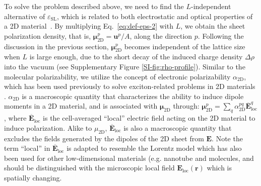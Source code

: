 \documentclass[journal=ancac3,manuscript=article,email=true,hyperref=true,keywords=false]{achemso}
\begin{document}
To solve the problem described above, we need to find the
$L$-independent alternative of $\varepsilon_{\mathrm{SL}}$, which is
related to both electrostatic and optical properties of a 2D
material~\cite{Matthes_2016}. By multiplying Eq.~\ref{eq:def-eps-2}
with $L$, we obtain the sheet polarization density, that is,
$\boldsymbol{\mu}_{\mathrm{2D}}^{p} =\boldsymbol{u}^{p}/A$, along the
direction $p$. Following the discussion in the previous section,
$\boldsymbol{\mu}_{\mathrm{2D}}^{p}$ becomes independent of the
lattice size when $L$ is large enough, due to the short decay of the 
induced charge density $\Delta \rho$ into the vacuum (see
Supplementary Figure \ref{SI-fig:rho-profile}).
%
Similar to the molecular polarizability\cite{Israelachvili_2011}, we
utilize the concept of electronic polarizability
$\alpha_{\mathrm{2D}}$, 
which has been used previously to solve
exciton-related problems in 2D materials
\cite{Cudazzo_2011_screening_2D,Olsen_2016_hydrogen,Jiang_2017_Eg_Eb}. 
%
$\alpha_{\mathrm{2D}}$ is a macroscopic quantity that characterizes
the ability to induce dipole moments in a 2D material, and is
associated with $\boldsymbol{\mu}_{\mathrm{2D}}$ through:
$\boldsymbol{\mu}_{\mathrm{2D}}^{p} = \sum_{q}
\alpha_{\mathrm{2D}}^{pq} \boldsymbol{\overline{E}}_{\mathrm{loc}}^{q}$\cite{T_bik_2004}, where
$\boldsymbol{\overline{E}}_{\mathrm{loc}}$ is the cell-averaged
``local'' electric field acting on the 2D material to induce
polarization\cite{}.
% 
Alike to $\mu_{\mathrm{2D}}$,
$\boldsymbol{\overline{E}}_{\mathrm{loc}}$ is also a macroscopic
quantity that excludes the fields generated by the dipoles of the 2D
sheet from $\boldsymbol{E}$. Note the term ``local'' in
$\boldsymbol{\overline{E}}_{\mathrm{loc}}$ is adapted to resemble the
Lorentz model\cite{Wiser_1963} which has also been used for other
low-dimensional materials (e.g. nanotube\cite{Benedict_1995} and
molecules\cite{T_bik_2004}, and should be distinguished with the
microscopic local field $\boldsymbol{E}_{\mathrm{loc}}(\boldsymbol{r})$ which is spatially
changing.
%
\end{document}
